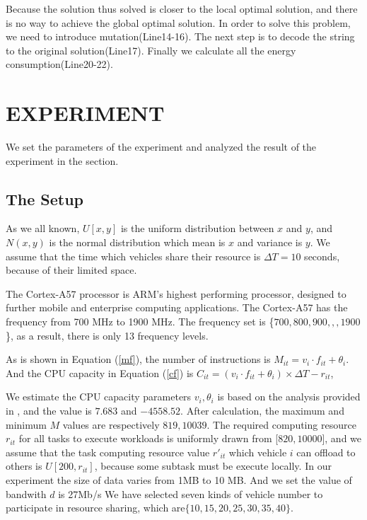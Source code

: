 \documentclass[conference]{IEEEtran}
\begin{document}
Because the solution thus solved is closer to the local optimal solution, and there is no way to achieve the global optimal solution. In order to solve this problem, we need to introduce mutation(Line14-16). 
The next step is to decode the string to the original solution(Line17).
Finally we calculate all the energy consumption(Line20-22).






\section{EXPERIMENT}
We set the parameters of the experiment and analyzed the result of the experiment in the section.

\subsection{The Setup}
As we all known, $U[x,y]$ is the uniform distribution between $x$ and $y$, and $N(x, y)$ is the normal distribution which  mean is $x$ and variance is $y$. 
We assume that the time which vehicles share their resource is $\Delta T = 10$ seconds, because of their limited space.

The Cortex-A57 processor is ARM's highest performing processor, designed to further mobile and enterprise computing applications\cite{a57}.
The Cortex-A57 has the frequency from 700 MHz to 1900 MHz. The frequency set is \{$700, 800, 900,,,1900$\}, as a result, there is only 13 frequency levels.

As is shown in Equation (\ref{mf}), the number of instructions is $M_{it} = v_i \cdot f_{it} + \theta_i$. 
And the CPU capacity in Equation (\ref{cf}) is $    	C_{it} = (v_i \cdot f_{it} + \theta_i)   \times \Delta T  - r_{it}$, 

We estimate the CPU capacity parameters $v_i, \theta_i$ is based on the analysis provided in \cite{vecman}, and the value is $7.683$ and $−4558.52$. 
After calculation, the maximum and minimum $M$  values are respectively $819, 10039$. 
The required computing resource $r_{it}$ for all tasks to execute workloads is uniformly drawn from [$ 820, 10000  $], and we assume that the task computing resource value $r'_{it}$ which vehicle $i$ can offload to others is $ U[200, r_{it}]$, because some subtask must be execute locally. 
In our experiment the size of data varies from 1MB to 10 MB. And we set the value of bandwith $d$ is 27Mb/s\cite{2017dsrc}
We have selected seven kinds of vehicle number to participate in resource sharing, which are$\{10,15, 20,25,30,35,40\}$. 
\end{document}
